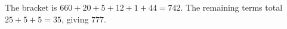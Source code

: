 The bracket is $660+20+5+12+1+44=742$. The remaining terms total $25+5+5=35$, giving $\boxed{777}$.
